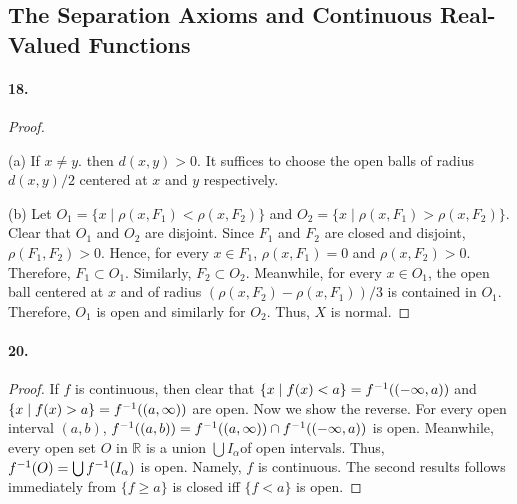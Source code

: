 \subsection{The Separation Axioms and Continuous Real-Valued Functions}
\paragraph{18.}
\begin{proof}
  $\,$\par
  (a) If $x \ne y$. then $d(x, y) > 0$. It suffices to choose the open balls
  of radius $d(x, y) / 2$ centered at $x$ and $y$ respectively.
  
  (b) Let $O_1 = \{x\mid \rho(x, F_1) < \rho(x, F_2) \}$ and $O_2 = \{
  x\mid \rho(x, F_1) > \rho(x, F_2)\}$. Clear that $O_1$ and $O_2$ are
  disjoint. Since $F_1$ and $F_2$ are closed and disjoint, $\rho(F_1, F_2)
  > 0$. Hence, for every $x\in F_1$, $\rho(x, F_1) = 0$ and $\rho(x, F_2)
  > 0$. Therefore, $F_1 \subset O_1$. Similarly, $F_2 \subset O_2$. Meanwhile,
  for every $x\in O_1$, the open ball centered at $x$ and of radius 
  $(\rho(x, F_2) - \rho(x, F_1))/3$ is contained in $O_1$. Therefore, $O_1$ is
  open and similarly for $O_2$. Thus, $X$ is normal.
\end{proof}

\paragraph{20.}
\begin{proof}
  If $f$ is continuous, then clear that $\{x\mid f(x) < a\} = 
  f^{-1}((-\infty, a))$ and $\{x\mid f(x) > a\} = f^{-1}((a, \infty))$ are open.
  Now we show the reverse. For every open interval $(a, b)$, $f^{-1}((a, b))
  = f^{-1}((a, \infty))\cap f^{-1}((-\infty, a))$ is open. Meanwhile, every open
  set $O$ in $\mathbb{R}$ is a union $\bigcup I_\alpha$of open intervals. Thus,
  $f^{-1}(O) = \bigcup f^{-1}(I_\alpha)$ is open. Namely, $f$ is continuous. 
  The second results follows immediately from $\{f \ge a\}$ is closed iff
  $\{f < a\}$ is open.
\end{proof}

